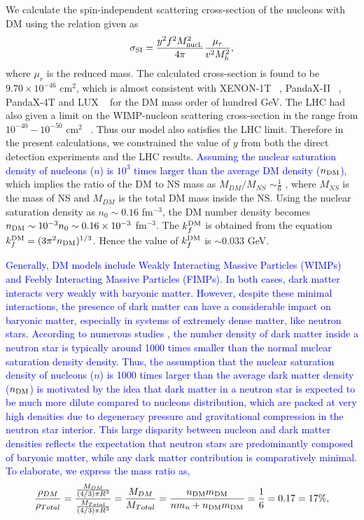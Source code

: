 {We calculate the spin-independent scattering cross-section of the nucleons with DM using the relation given as ~\cite{Cline_2013}}
\begin{eqnarray}
	\sigma_{\rm SI}=\frac{y^2f^2M_{\rm nucl.}^2}{4\pi}\frac{\mu_r}{v^2M_h^2},
\end{eqnarray}
where $\mu_r$ is the reduced mass. The calculated cross-section is found to be $9.70\times10^{-46}$ cm$^{2}$, which is almost consistent with XENON-1T ~\cite{Xenon1T_2016}, PandaX-II ~\cite{PandaX_2016}, PandaX-4T \cite{Meng_2021} and LUX ~\cite{LUX_2017} for the DM mass order of hundred GeV. The LHC had also given a limit on the WIMP-nucleon scattering cross-section in the range from $10^{-40}- 10^{-50}$ cm$^{2}$ ~\cite{Djouadi_2012}. Thus our model also satisfies the LHC limit. Therefore in the present calculations, we constrained the value of $y$ from both the direct detection experiments and the LHC results. \textcolor{blue}{Assuming the nuclear saturation density of nucleons ($n$) is $10^3$ times larger than the average DM density ($n_{\rm DM}$)}, which implies the ratio  of the DM to NS mass as $M_{DM}/M_{NS}$ $\sim \frac{1}{6}$ \cite{DM1}, where $M_{NS}$ is the mass of NS and $M_{DM}$ is the total DM mass inside the NS. Using the nuclear saturation density as $n_0 \sim 0.16$ fm$^{-3}$, the DM number density becomes $n_{\rm DM} \sim 10^{-3}n_0\sim 0.16\times 10^{-3}$ fm$^{-3}$. The $k_{f}^{\rm DM}$ is obtained from the equation $k_f^{\rm DM}=(3\pi^2 n_{\rm DM})^{1/3}$. Hence the value of $k_{f}^{\rm DM}$ is $\sim 0.033$ GeV. 

\textcolor{blue}{ Generally, DM models include Weakly Interacting Massive Particles (WIMPs) and Feebly Interacting Massive Particles (FIMPs). In both cases, dark matter interacts very weakly with baryonic matter. However, despite these minimal interactions, the presence of dark matter can have a considerable impact on baryonic matter, especially in systems of extremely dense matter, like neutron stars. According to numerous studies \cite{DM1,DM2,DM3,ankit2024}, the number density of dark matter inside a neutron star is typically around 1000 times smaller than the normal nuclear saturation density density. Thus, the assumption that the nuclear saturation density of nucleons ($n$) is 1000 times larger than the average dark matter density ($n_{\rm DM}$) is motivated by the idea that dark matter in a neutron star is expected to be much more dilute compared to nucleons distribution, which are packed at very high densities due to degeneracy pressure and gravitational compression in the neutron star interior. This large disparity between nucleon and dark matter densities reflects the expectation that neutron stars are predominantly composed of baryonic matter, while any dark matter contribution is comparatively minimal. To elaborate, we express the mass ratio as,}
\begin{equation}
	\frac{\rho_{DM}}{\rho_{Total }} = \frac{\frac{M_{DM}}{(4/3) \pi R^3}}{\frac{M_{Total}}{(4/3) \pi R^3}}  = \frac{M_{DM}}{M_{Total }} = \frac{n_{\rm DM} m_{\rm DM}}{n m_n + n_{\rm DM} m_{\rm DM} } = \frac{1}{6} = 0.17 =17\%,
\end{equation}

